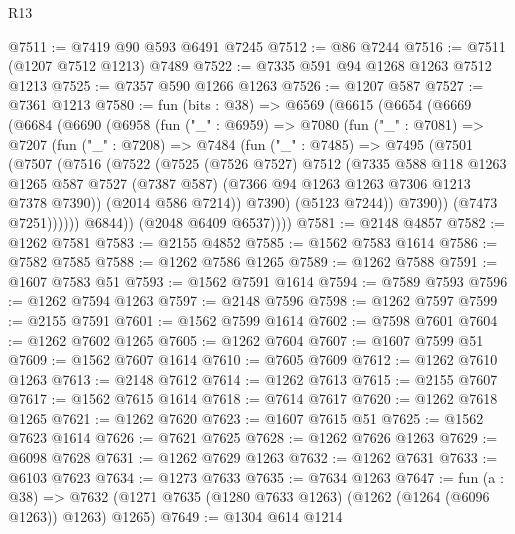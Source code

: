 \begin{lexlean}{R13}
\begin{coremodule}
@7511 := @7419 @90 @593 @6491 @7245
@7512 := @86 @7244
@7516 := @7511 (@1207 @7512 @1213) @7489
@7522 := @7335 @591 @94 @1268 @1263 @7512 @1213
@7525 := @7357 @590 @1266 @1263
@7526 := @1207 @587
@7527 := @7361 @1213
@7580 := fun (bits : @38) =>
  @6569
    (@6615
      (@6654
        (@6669
          (@6684
            (@6690
              (@6958
                (fun ("_" : @6959) =>
                @7080
                  (fun ("_" : @7081) =>
                  @7207
                    (fun ("_" : @7208) =>
                    @7484
                      (fun ("_" : @7485) =>
                      @7495
                        (@7501
                          (@7507
                            (@7516
                              (@7522
                                (@7525
                                  (@7526 @7527)
                                  @7512
                                  (@7335
                                    @588
                                    @118
                                    @1263
                                    @1265
                                    @587
                                    @7527
                                    (@7387 @587)
                                    (@7366 @94 @1263 @1263 @7306 @1213 @7378 @7390))
                                  (@2014 @586 @7214))
                                @7390)
                              (@5123 @7244))
                            @7390))
                        (@7473 @7251))))))
              @6844))
          (@2048 @6409 @6537))))
@7581 := @2148 @4857
@7582 := @1262 @7581
@7583 := @2155 @4852
@7585 := @1562 @7583 @1614
@7586 := @7582 @7585
@7588 := @1262 @7586 @1265
@7589 := @1262 @7588
@7591 := @1607 @7583 @51
@7593 := @1562 @7591 @1614
@7594 := @7589 @7593
@7596 := @1262 @7594 @1263
@7597 := @2148 @7596
@7598 := @1262 @7597
@7599 := @2155 @7591
@7601 := @1562 @7599 @1614
@7602 := @7598 @7601
@7604 := @1262 @7602 @1265
@7605 := @1262 @7604
@7607 := @1607 @7599 @51
@7609 := @1562 @7607 @1614
@7610 := @7605 @7609
@7612 := @1262 @7610 @1263
@7613 := @2148 @7612
@7614 := @1262 @7613
@7615 := @2155 @7607
@7617 := @1562 @7615 @1614
@7618 := @7614 @7617
@7620 := @1262 @7618 @1265
@7621 := @1262 @7620
@7623 := @1607 @7615 @51
@7625 := @1562 @7623 @1614
@7626 := @7621 @7625
@7628 := @1262 @7626 @1263
@7629 := @6098 @7628
@7631 := @1262 @7629 @1263
@7632 := @1262 @7631
@7633 := @6103 @7623
@7634 := @1273 @7633
@7635 := @7634 @1263
@7647 := fun (a : @38) =>
  @7632 (@1271 @7635 (@1280 @7633 @1263) (@1262 (@1264 (@6096 @1263)) @1263) @1265)
@7649 := @1304 @614 @1214

\end{coremodule}
\end{lexlean}
